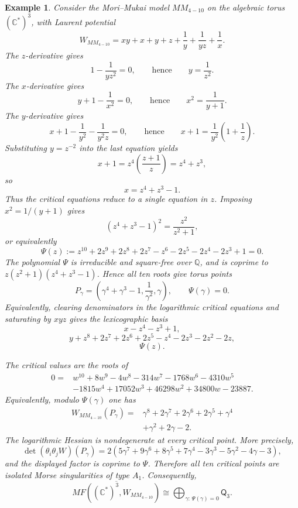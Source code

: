 \documentclass[11pt]{amsart}
\newtheorem{example}{Example}[section]
\newcommand{\MorseCat}[1]{\mathsf{Q}_{#1}}
\begin{document}
\begin{example}
Consider the Mori--Mukai model $MM_{4-10}$ on the algebraic torus
$(\mathbb{C}^*)^3$, with Laurent potential
\[
W_{MM_{4-10}}=xy+x+y+z+\frac{1}{y}+\frac{1}{yz}+\frac{1}{x}.
\]
The $z$-derivative gives
\[
1-\frac{1}{yz^2}=0,
\qquad\text{hence}\qquad
y=\frac{1}{z^2}.
\]
The $x$-derivative gives
\[
y+1-\frac{1}{x^2}=0,
\qquad\text{hence}\qquad
x^2=\frac{1}{y+1}.
\]
The $y$-derivative gives
\[
x+1-\frac{1}{y^2}-\frac{1}{y^2z}=0,
\qquad\text{hence}\qquad
x+1=\frac{1}{y^2}\left(1+\frac{1}{z}\right).
\]
Substituting $y=z^{-2}$ into the last equation yields
\[
x+1=z^4\left(\frac{z+1}{z}\right)=z^4+z^3,
\]
so
\[
x=z^4+z^3-1.
\]
Thus the critical equations reduce to a single equation in $z$. Imposing
$x^2=1/(y+1)$ gives
\[
(z^4+z^3-1)^2=\frac{z^2}{z^2+1},
\]
or equivalently
\[
\Psi(z):=z^{10}+2z^9+2z^8+2z^7-z^6-2z^5
-2z^4-2z^3+1=0.
\]
The polynomial $\Psi$ is irreducible and square-free over $\mathbb{Q}$, and is
coprime to $z(z^2+1)(z^4+z^3-1)$. Hence all ten roots give torus points
\[
P_\gamma=\left(
\gamma^4+\gamma^3-1,
\frac{1}{\gamma^2},
\gamma
\right),
\qquad
\Psi(\gamma)=0.
\]
Equivalently, clearing denominators in the logarithmic critical equations and
saturating by $xyz$ gives the lexicographic basis
\[
x-z^4-z^3+1,
\]
\[
y+z^8+2z^7+2z^6+2z^5-z^4-2z^3-2z^2-2z,
\]
\[
\Psi(z).
\]

The critical values are the roots of
\[
\begin{aligned}
0={}&w^{10}+8w^9-4w^8-314w^7-1768w^6-4310w^5 \\
&-1815w^4+17052w^3+46298w^2+34800w-23887.
\end{aligned}
\]
Equivalently, modulo $\Psi(\gamma)$ one has
\[
\begin{aligned}
W_{MM_{4-10}}(P_\gamma)={}&
\gamma^8+2\gamma^7+2\gamma^6+2\gamma^5+\gamma^4 \\
&+\gamma^2+2\gamma-2.
\end{aligned}
\]
The logarithmic Hessian is nondegenerate at every critical point. More
precisely,
\[
\det(\theta_i\theta_jW)(P_\gamma)
=2(5\gamma^7+9\gamma^6+8\gamma^5+7\gamma^4
-3\gamma^3-5\gamma^2-4\gamma-3),
\]
and the displayed factor is coprime to $\Psi$. Therefore all ten critical
points are isolated Morse singularities of type $A_1$. Consequently,
\[
\overline{MF((\mathbb{C}^*)^3,W_{MM_{4-10}})}
\cong \bigoplus_{\gamma:\,\Psi(\gamma)=0}\MorseCat{3}.
\]
\end{example}
\end{document}
